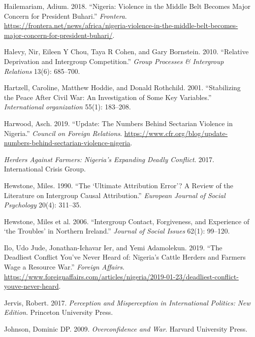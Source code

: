 \documentclass[11pt]{article}
\begin{document}
\leavevmode\hypertarget{ref-frontera2018nigeria}{}%
Hailemariam, Adium. 2018. ``Nigeria: Violence in the Middle Belt Becomes
Major Concern for President Buhari.'' \emph{Frontera}.
\url{https://frontera.net/news/africa/nigeria-violence-in-the-middle-belt-becomes-major-concern-for-president-buhari/}.

\leavevmode\hypertarget{ref-halevy2010relative}{}%
Halevy, Nir, Eileen Y Chou, Taya R Cohen, and Gary Bornstein. 2010.
``Relative Deprivation and Intergroup Competition.'' \emph{Group
Processes \& Intergroup Relations} 13(6): 685--700.

\leavevmode\hypertarget{ref-hartzell2001stabilizing}{}%
Hartzell, Caroline, Matthew Hoddie, and Donald Rothchild. 2001.
``Stabilizing the Peace After Civil War: An Investigation of Some Key
Variables.'' \emph{International organization} 55(1): 183--208.

\leavevmode\hypertarget{ref-council2019nigeria}{}%
Harwood, Asch. 2019. ``Update: The Numbers Behind Sectarian Violence in
Nigeria.'' \emph{Council on Foreign Relations}.
\url{https://www.cfr.org/blog/update-numbers-behind-sectarian-violence-nigeria}.

\leavevmode\hypertarget{ref-icg2017nigeria}{}%
\emph{Herders Against Farmers: Nigeria's Expanding Deadly Conflict}.
2017. International Crisis Group.

\leavevmode\hypertarget{ref-hewstone1990ultimate}{}%
Hewstone, Miles. 1990. ``The `Ultimate Attribution Error'? A Review of
the Literature on Intergroup Causal Attribution.'' \emph{European
Journal of Social Psychology} 20(4): 311--35.

\leavevmode\hypertarget{ref-hewstone2006intergroup}{}%
Hewstone, Miles et al. 2006. ``Intergroup Contact, Forgiveness, and
Experience of `the Troubles' in Northern Ireland.'' \emph{Journal of
Social Issues} 62(1): 99--120.

\leavevmode\hypertarget{ref-fa2019deadly}{}%
Ilo, Udo Jude, Jonathan-Ichavar Ier, and Yemi Adamolekun. 2019. ``The
Deadliest Conflict You've Never Heard of: Nigeria's Cattle Herders and
Farmers Wage a Resource War.'' \emph{Foreign Affairs}.
\url{https://www.foreignaffairs.com/articles/nigeria/2019-01-23/deadliest-conflict-youve-never-heard}.

\leavevmode\hypertarget{ref-jervis2017perception}{}%
Jervis, Robert. 2017. \emph{Perception and Misperception in
International Politics: New Edition}. Princeton University Press.

\leavevmode\hypertarget{ref-johnson2009overconfidence}{}%
Johnson, Dominic DP. 2009. \emph{Overconfidence and War}. Harvard
University Press.
\end{document}
